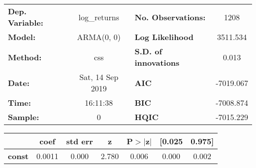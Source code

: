 \begin{center}
\begin{tabular}{lclc}
\toprule
\textbf{Dep. Variable:} &   log\_returns   & \textbf{  No. Observations:  } &    1208     \\
\textbf{Model:}         &    ARMA(0, 0)    & \textbf{  Log Likelihood     } &  3511.534   \\
\textbf{Method:}        &       css        & \textbf{  S.D. of innovations} &   0.013     \\
\textbf{Date:}          & Sat, 14 Sep 2019 & \textbf{  AIC                } & -7019.067   \\
\textbf{Time:}          &     16:11:38     & \textbf{  BIC                } & -7008.874   \\
\textbf{Sample:}        &        0         & \textbf{  HQIC               } & -7015.229   \\
\bottomrule
\end{tabular}
\begin{tabular}{lcccccc}
               & \textbf{coef} & \textbf{std err} & \textbf{z} & \textbf{P$> |$z$|$} & \textbf{[0.025} & \textbf{0.975]}  \\
\midrule
\textbf{const} &       0.0011  &        0.000     &     2.780  &         0.006        &        0.000    &        0.002     \\
\bottomrule
\end{tabular}
\end{center}
